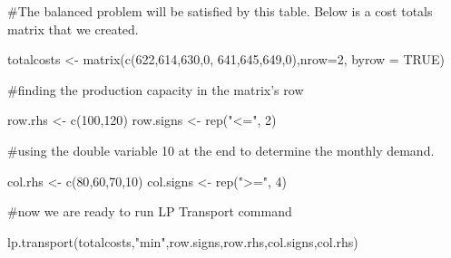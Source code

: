 \documentclass[
]{article}
\newenvironment{Shaded}{\begin{snugshade}}{\end{snugshade}}
\newcommand{\AttributeTok}[1]{\textcolor[rgb]{0.77,0.63,0.00}{#1}}
\newcommand{\ConstantTok}[1]{\textcolor[rgb]{0.00,0.00,0.00}{#1}}
\newcommand{\DecValTok}[1]{\textcolor[rgb]{0.00,0.00,0.81}{#1}}
\newcommand{\FunctionTok}[1]{\textcolor[rgb]{0.00,0.00,0.00}{#1}}
\newcommand{\NormalTok}[1]{#1}
\newcommand{\OtherTok}[1]{\textcolor[rgb]{0.56,0.35,0.01}{#1}}
\newcommand{\StringTok}[1]{\textcolor[rgb]{0.31,0.60,0.02}{#1}}
\begin{document}
\#The balanced problem will be satisfied by this table. Below is a cost
totals matrix that we created.

\begin{Shaded}
\begin{Highlighting}[]
\NormalTok{totalcosts }\OtherTok{\textless{}{-}} \FunctionTok{matrix}\NormalTok{(}\FunctionTok{c}\NormalTok{(}\DecValTok{622}\NormalTok{,}\DecValTok{614}\NormalTok{,}\DecValTok{630}\NormalTok{,}\DecValTok{0}\NormalTok{,}
                   \DecValTok{641}\NormalTok{,}\DecValTok{645}\NormalTok{,}\DecValTok{649}\NormalTok{,}\DecValTok{0}\NormalTok{),}\AttributeTok{nrow=}\DecValTok{2}\NormalTok{, }\AttributeTok{byrow =} \ConstantTok{TRUE}\NormalTok{)}
\end{Highlighting}
\end{Shaded}

\#finding the production capacity in the matrix's row

\begin{Shaded}
\begin{Highlighting}[]
\NormalTok{row.rhs }\OtherTok{\textless{}{-}} \FunctionTok{c}\NormalTok{(}\DecValTok{100}\NormalTok{,}\DecValTok{120}\NormalTok{)}
\NormalTok{ row.signs }\OtherTok{\textless{}{-}} \FunctionTok{rep}\NormalTok{(}\StringTok{"\textless{}="}\NormalTok{, }\DecValTok{2}\NormalTok{)}
\end{Highlighting}
\end{Shaded}

\#using the double variable 10 at the end to determine the monthly
demand.

\begin{Shaded}
\begin{Highlighting}[]
\NormalTok{col.rhs }\OtherTok{\textless{}{-}} \FunctionTok{c}\NormalTok{(}\DecValTok{80}\NormalTok{,}\DecValTok{60}\NormalTok{,}\DecValTok{70}\NormalTok{,}\DecValTok{10}\NormalTok{)}
\NormalTok{ col.signs }\OtherTok{\textless{}{-}} \FunctionTok{rep}\NormalTok{(}\StringTok{"\textgreater{}="}\NormalTok{, }\DecValTok{4}\NormalTok{)}
\end{Highlighting}
\end{Shaded}

\#now we are ready to run LP Transport command

\begin{Shaded}
\begin{Highlighting}[]
\FunctionTok{lp.transport}\NormalTok{(totalcosts,}\StringTok{"min"}\NormalTok{,row.signs,row.rhs,col.signs,col.rhs)}
\end{Highlighting}
\end{Shaded}
\end{document}
